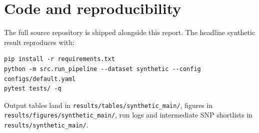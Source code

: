 \documentclass[11pt,a4paper]{article}
\begin{document}
\appendix
\section{Code and reproducibility}
The full source repository is shipped alongside this report. The headline
synthetic result reproduces with:
\begin{verbatim}
pip install -r requirements.txt
python -m src.run_pipeline --dataset synthetic --config configs/default.yaml
pytest tests/ -q
\end{verbatim}
Output tables land in \texttt{results/tables/synthetic\_main/}, figures
in \texttt{results/figures/synthetic\_main/}, run logs and intermediate
SNP shortlists in \texttt{results/synthetic\_main/}.
\end{document}
